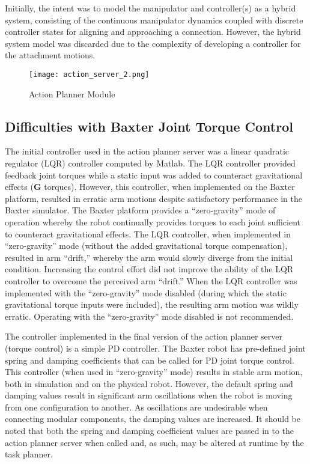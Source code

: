 Initially, the intent was to model the manipulator and controller(s) as a hybrid system, consisting of the continuous manipulator dynamics coupled with discrete controller states for aligning and approaching a connection.
However, the hybrid system model was discarded due to the complexity of developing a controller for the attachment motions.

\begin{figure}[h]
	\texttt{[image: action\_server\_2.png]}
	\caption{Action Planner Module}
	\label{fig:actionPlannerFlow}
\end{figure}


\subsection{Difficulties with Baxter Joint Torque Control}
The initial controller used in the action planner server was a linear quadratic regulator (LQR) controller computed by Matlab.
The LQR controller provided feedback joint torques while a static input was added to counteract gravitational effects ($\mathbf{G}$ torques).
However, this controller, when implemented on the Baxter platform, resulted in erratic arm motions despite satisfactory performance in the Baxter simulator.
The Baxter platform provides a ``zero-gravity'' mode of operation whereby the robot continually provides torques to each joint sufficient to counteract gravitational effects.
The LQR controller, when implemented in ``zero-gravity'' mode (without the added gravitational torque compensation), resulted in arm ``drift,'' whereby the arm would slowly diverge from the initial condition.
Increasing the control effort did not improve the ability of the LQR controller to overcome the perceived arm ``drift.''
When the LQR controller was implemented with the ``zero-gravity'' mode disabled (during which the static gravitational torque inputs were included), the resulting arm motion was wildly erratic.
Operating with the ``zero-gravity'' mode disabled is not recommended.

The controller implemented in the final version of the action planner server (torque control) is a simple PD controller.
The Baxter robot has pre-defined joint spring and damping coefficients that can be called for PD joint torque control.
This controller (when used in ``zero-gravity'' mode) results in stable arm motion, both in simulation and on the physical robot.
However, the default spring and damping values result in significant arm oscillations when the robot is moving from one configuration to another.
As oscillations are undesirable when connecting modular components, the damping values are increased.
It should be noted that both the spring and damping coefficient values are passed in to the action planner server when called and, as such, may be altered at runtime by the task planner.

